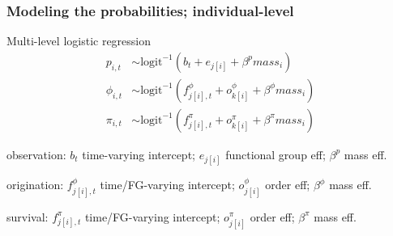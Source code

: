 \documentclass{beamer}
\begin{document}
\begin{frame}
  \frametitle{Modeling the probabilities; individual-level}
  \begin{block}{Multi-level logistic regression}
    \begin{align*}
      p_{i, t} &\sim \text{logit}^{-1}(b_{t} + e_{j[i]} + \beta^{p} mass_{i}) \\
      \phi_{i, t} &\sim \text{logit}^{-1}(f^{\phi}_{j[i], t} + o^{\phi}_{k[i]} + \beta^{\phi} mass_{i}) \\
      \pi_{i, t} &\sim \text{logit}^{-1}(f^{\pi}_{j[i], t} + o^{\pi}_{k[i]} + \beta^{\pi} mass_{i})
    \end{align*}
    \begin{scriptsize}
      observation: \(b_{t}\) time-varying intercept; \(e_{j[i]}\) functional group eff; \(\beta^{p}\) mass eff.

      origination: \(f^{\phi}_{j[i], t}\) time/FG-varying intercept; \(o^{\phi}_{j[i]}\) order eff; \(\beta^{\phi}\) mass eff.

      survival: \(f^{\pi}_{j[i], t}\) time/FG-varying intercept; \(o^{\pi}_{j[i]}\) order eff; \(\beta^{\pi}\) mass eff.
    \end{scriptsize}
  \end{block}
\end{frame}
\end{document}
